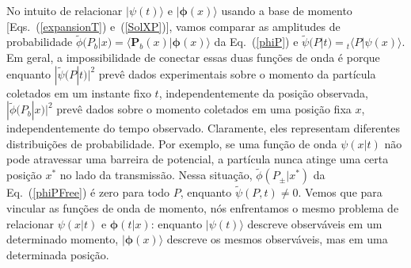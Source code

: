No intuito de relacionar $|\psi(t)\rangle$ e $|\pmb{\phi}(x)\rangle$ usando a base de momento [Eqs.~(\ref{expansionT}) e~(\ref{SolXP})], vamos comparar as amplitudes de probabilidade ${\tilde \phi}(P_b|x)={\langle} \pmb{P}_b (x)|\pmb{\phi}(x)\rangle$ da Eq.~(\ref{phiP}) e ${\tilde \psi}(P|t)={_t\langle} P|\psi(x)\rangle$. Em geral, a impossibilidade de conectar essas duas funções de onda é porque enquanto $|{\tilde \psi} (P|t)|^2$ prevê dados experimentais sobre o momento da partícula coletados em um instante fixo $t$, independentemente da posição observada, $ |{\tilde \phi}(P_b|x)|^2$ prevê dados sobre o momento coletados em uma posição fixa $x$, independentemente do tempo observado. Claramente, eles representam diferentes distribuições de probabilidade. Por exemplo, se uma função de onda $\psi(x|t)$ não pode atravessar uma barreira de potencial, a partícula nunca atinge uma certa posição $x^*$ no lado da transmissão. Nessa situação, ${\tilde \phi}(P_\pm|x^*)$ da Eq.~(\ref{phiPFree}) é zero para todo $P$, enquanto ${\tilde \psi }(P,t) \neq 0$. Vemos que para vincular as funções de onda de momento, nós enfrentamos o mesmo problema de relacionar $\psi(x|t)$ e $\pmb{\phi}(t|x)$: enquanto $|\psi(t)\rangle$ descreve observáveis em um determinado momento, $|\pmb{\phi}(x)\rangle$ descreve os mesmos observáveis, mas em uma determinada posição.










